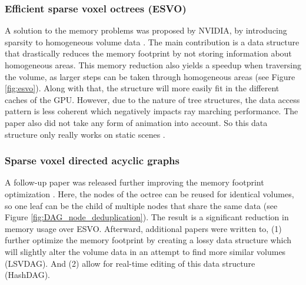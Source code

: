 \subsubsection{Efficient sparse voxel octrees (ESVO)} \label{related_work:voxel_data_structures:esvo}
A solution to the memory problems was proposed by NVIDIA, by introducing sparsity to homogeneous volume data \cite{laine2010efficient}. The main contribution is a data structure that drastically reduces the memory footprint by not storing information about homogeneous areas. This memory reduction also yields a speedup when traversing the volume, as larger steps can be taken through homogeneous areas (see Figure \ref{fig:esvo}). Along with that, the structure will more easily fit in the different caches of the GPU. However, due to the nature of tree structures, the data access pattern is less coherent which negatively impacts ray marching performance. The paper also did not take any form of animation into account. So this data structure only really works on static scenes \cite{JohnLinPerfectEngine}.


\subsubsection{Sparse voxel directed acyclic graphs} \label{related_work:voxel_data_structures:svdag}
A follow-up paper was released further improving the memory footprint optimization \cite{kampe2013high}. Here, the nodes of the octree can be reused for identical volumes, so one leaf can be the child of multiple nodes that share the same data (see Figure \ref{fig:DAG_node_deduplication}). The result is a significant reduction in memory usage over ESVO. Afterward, additional papers were written to, (1) further optimize the memory footprint by creating a lossy data structure which will slightly alter the volume data in an attempt to find more similar volumes \cite{van2020lossy} (LSVDAG). And (2) allow for real-time editing of this data structure \cite{careil2020interactively} (HashDAG).


